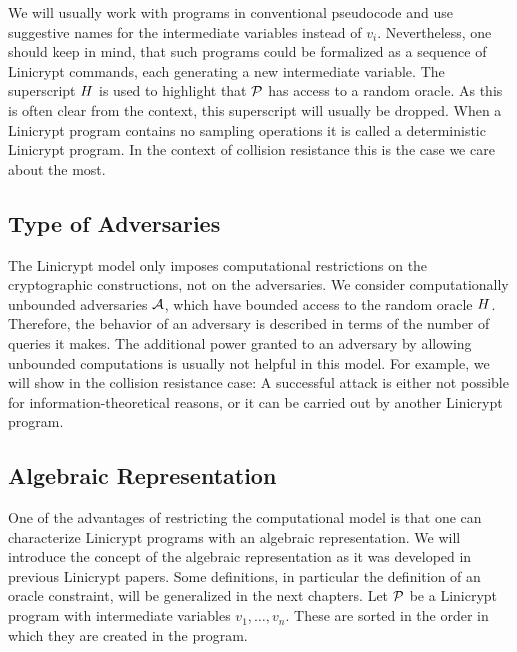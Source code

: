 We will usually work with programs in conventional pseudocode and use suggestive names for the intermediate variables instead of $v_i$.
Nevertheless, one should keep in mind,
that such programs could be formalized as a sequence of Linicrypt commands,
each generating a new intermediate variable.
The superscript $\H$ is used to highlight that $\P$ has access to a random oracle.
As this is often clear from the context, this superscript will usually be dropped.
When a Linicrypt program contains no sampling operations it is called a deterministic Linicrypt program. 
In the context of collision resistance this is the case we care about the most.

\subsection{Type of Adversaries}
The Linicrypt model only imposes computational restrictions on the cryptographic constructions,
not on the adversaries.
We consider computationally unbounded adversaries $\A$,
which have bounded access to the random oracle $\H$.
Therefore, the behavior of an adversary is described in terms of the number of queries it makes.
The additional power granted to an adversary by allowing unbounded computations is usually not helpful in this model.
For example, we will show in the collision resistance case:
A successful attack is either not possible for information-theoretical reasons,
or it can be carried out by another Linicrypt program.

\subsection{Algebraic Representation}

One of the advantages of restricting the computational model is that one can characterize
Linicrypt programs with an algebraic representation.
We will introduce the concept of the algebraic representation as it was developed in previous Linicrypt papers.
Some definitions, in particular the definition of an oracle constraint, will be generalized in the next chapters.
Let $\P$ be a Linicrypt program with intermediate variables $v_1, \dots, v_n$.
These are sorted in the order in which they are created in the program.

